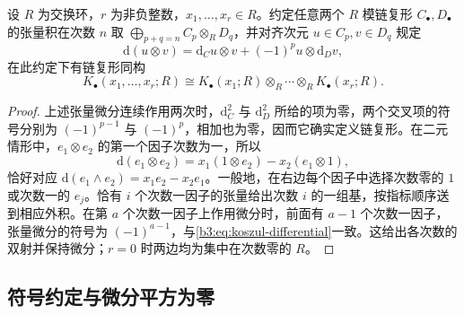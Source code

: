 \begin{proposition}\label{b3:prop:koszul-tensor}
	设 \(R\) 为交换环，\(r\) 为非负整数，\(x_1,\ldots,x_r\in R\)。约定任意两个 \(R\) 模链复形 \(C_\bullet,D_\bullet\) 的张量积在次数 \(n\) 取 \(\bigoplus_{p+q=n}C_p\otimes_RD_q\)，并对齐次元 \(u\in C_p,v\in D_q\) 规定
	\[
		\mathrm{d}(u\otimes v)=\mathrm{d}_Cu\otimes v+(-1)^p u\otimes \mathrm{d}_Dv,
	\]
	在此约定下有链复形同构
	\[
		K_\bullet(x_1,\ldots,x_r;R) \cong K_\bullet(x_1;R)\otimes_R\cdots\otimes_RK_\bullet(x_r;R).
	\]
\end{proposition}
\begin{proof}
	上述张量微分连续作用两次时，\(\mathrm{d}_C^2\) 与 \(\mathrm{d}_D^2\) 所给的项为零，两个交叉项的符号分别为 \((-1)^{p-1}\) 与 \((-1)^p\)，相加也为零，因而它确实定义链复形。在二元情形中，\(e_1\otimes e_2\) 的第一个因子次数为一，所以
	\[
		\mathrm{d}(e_1\otimes e_2) =x_1(1\otimes e_2)-x_2(e_1\otimes1),
	\]
	恰好对应 \(\mathrm{d}(e_1\wedge e_2)=x_1e_2-x_2e_1\)。一般地，在右边每个因子中选择次数零的 \(1\) 或次数一的 \(e_j\)。恰有 \(i\) 个次数一因子的张量给出次数 \(i\) 的一组基，按指标顺序送到相应外积。在第 \(a\) 个次数一因子上作用微分时，前面有 \(a-1\) 个次数一因子，张量微分的符号为 \((-1)^{a-1}\)，与\eqref{b3:eq:koszul-differential}一致。这给出各次数的双射并保持微分；\(r=0\) 时两边均为集中在次数零的 \(R\)。
\end{proof}

\subsection{符号约定与微分平方为零}
\label{b3:subsec:1502:03}

